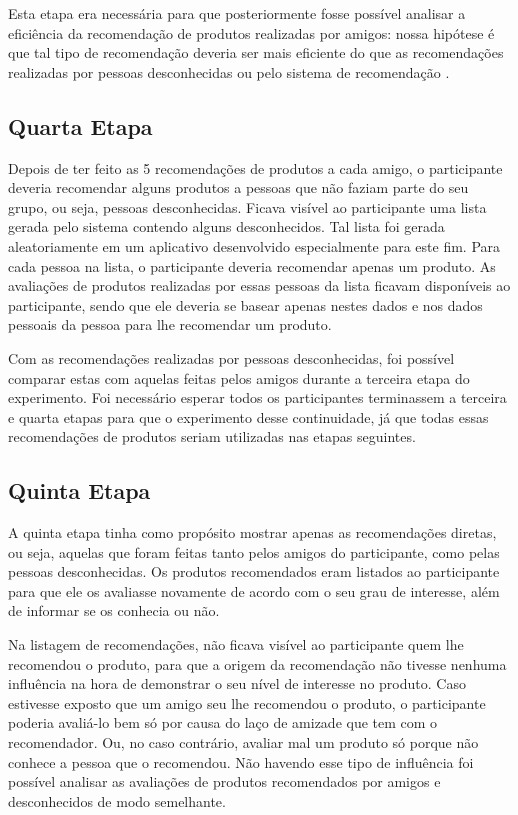 Esta etapa era necessária para que posteriormente fosse possível analisar a eficiência da recomendação de produtos realizadas por amigos: nossa hipótese é que tal tipo de recomendação deveria ser mais eficiente do que as recomendações realizadas por pessoas desconhecidas ou pelo sistema de recomendação \cite{bonhard2007devil}.

\subsection{Quarta Etapa}

Depois de ter feito as 5 recomendações de produtos a cada amigo, o participante deveria recomendar alguns produtos a pessoas que não faziam parte do seu grupo, ou seja, pessoas desconhecidas. Ficava visível ao participante uma lista gerada pelo sistema contendo alguns desconhecidos. Tal lista foi gerada aleatoriamente em um aplicativo desenvolvido especialmente para este fim. Para cada pessoa na lista, o participante deveria recomendar apenas um produto. As avaliações de produtos realizadas por essas pessoas da lista ficavam disponíveis ao participante, sendo que ele deveria se basear apenas nestes dados e nos dados pessoais da pessoa para lhe recomendar um produto.

Com as recomendações realizadas por pessoas desconhecidas, foi possível comparar estas com aquelas feitas pelos amigos durante a terceira etapa do experimento. Foi necessário esperar todos os participantes terminassem a terceira e quarta etapas para que o experimento desse continuidade, já que todas essas recomendações de produtos seriam utilizadas nas etapas seguintes.

\subsection{Quinta Etapa}

A quinta etapa tinha como propósito mostrar apenas as recomendações diretas, ou seja, aquelas que foram feitas tanto pelos amigos do participante, como pelas pessoas desconhecidas. Os produtos recomendados eram listados ao participante para que ele os avaliasse novamente de acordo com o seu grau de interesse, além de informar se os conhecia ou não.

Na listagem de recomendações, não ficava visível ao participante quem lhe recomendou o produto, para que a origem da recomendação não tivesse nenhuma influência na hora de demonstrar o seu nível de interesse no produto. Caso estivesse exposto que um amigo seu lhe recomendou o produto, o participante poderia avaliá-lo bem só por causa do laço de amizade que tem com o recomendador. Ou, no caso contrário, avaliar mal um produto só porque não conhece a pessoa que o recomendou. Não havendo esse tipo de influência foi possível analisar as avaliações de produtos recomendados por amigos e desconhecidos de modo semelhante.

